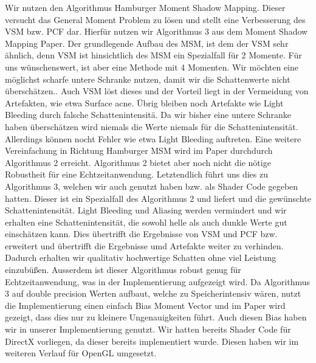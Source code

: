 \documentclass[runningheaders,a4paper]{llncs}
\begin{document}
Wir nutzen den Algorithmus Hamburger Moment Shadow Mapping. Dieser versucht das General Moment Problem zu lösen und stellt eine Verbesserung des VSM bzw. PCF dar. Hierfür nutzen wir Algorithmus 3 aus dem Moment Shadow Mapping Paper.\cite{msm} Der grundlegende Aufbau des MSM, ist dem der VSM sehr ähnlich, denn VSM ist hinsichtlich des MSM ein Spezialfall für 2 Momente. Für uns wünschenswert, ist aber eine Methode mit 4 Momenten.
Wir möchten eine möglichst scharfe untere Schranke nutzen, damit wir die Schattenwerte nicht überschätzen.\cite{msm}. 
Auch VSM löst dieses und der Vorteil liegt in der Vermeidung von Artefakten, wie etwa Surface acne. Übrig bleiben noch Artefakte wie Light Bleeding durch falsche Schattenintensitä. Da wir bisher eine untere Schranke haben überschätzen wird niemals die Werte niemals für die Schattenintensität. Allerdings können nocht Fehler wie etwa Light Bleeding auftreten. 
Eine weitere Vereinfachung in Richtung Hamburger MSM wird im Paper durchdurch Algorithmus 2 erreicht.
Algorithmus 2 bietet aber noch nicht die nötige Robustheit für eine Echtzeitanwendung.\cite{msm}
Letztendlich führt uns dies zu Algorithmus 3, welchen wir auch genutzt haben bzw. als Shader Code gegeben hatten. Dieser ist ein Spezialfall des Algorithmus 2 und liefert und  die gewünschte Schattenintensität. 
Light Bleeding und Aliasing werden vermindert und wir erhalten eine Schattenintensität, die sowohl helle als auch dunkle Werte gut einschätzen kann. Dies übertrifft die Ergebnisse von VSM und PCF bzw. erweitert und übertrifft die Ergebnisse umd Artefakte weiter zu verhinden. Dadurch erhalten wir qualitativ hochwertige Schatten ohne viel Leistung einzubüßen. Ausserdem ist dieser Algorithmus robust genug für Echtzeitanwendung, was in der Implementierung aufgezeigt wird. 
Da Algorithmus 3 auf double precision Werten aufbaut, welche zu Speicherintensiv wären, nutzt die Implementierung einen einfach Bias Moment Vector und im Paper wird gezeigt, dass dies nur zu kleinere Ungenauigkeiten führt.\cite{msm} Auch diesen Bias haben wir in unserer Implementierung genutzt. Wir hatten bereits Shader Code für DirectX vorliegen, da dieser bereits implementiert wurde. Diesen haben wir im weiteren Verlauf für OpenGL umgesetzt.
\end{document}
